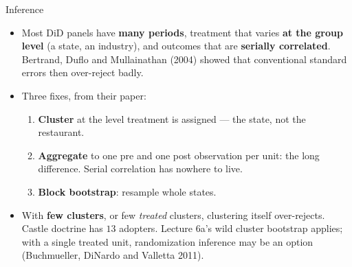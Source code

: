 \documentclass[
  11pt,
  ignorenonframetext,
  aspectratio=169,
]{beamer}
\providecommand{\tightlist}{%
  \setlength{\itemsep}{0pt}\setlength{\parskip}{0pt}}
\begin{document}
\begin{frame}{Inference}
\protect{}\label{inference}
\begin{itemize}
\tightlist
\item
  Most DiD panels have \textbf{many periods}, treatment that varies
  \textbf{at the group level} (a state, an industry), and outcomes that
  are \textbf{serially correlated}. Bertrand, Duflo and Mullainathan
  (2004) showed that conventional standard errors then over-reject
  badly.
\item
  Three fixes, from their paper:

  \begin{enumerate}
  \tightlist
  \item
    \textbf{Cluster} at the level treatment is assigned --- the state,
    not the restaurant.
  \item
    \textbf{Aggregate} to one pre and one post observation per unit: the
    long difference. Serial correlation has nowhere to live.
  \item
    \textbf{Block bootstrap}: resample whole states.
  \end{enumerate}
\end{itemize}

\vspace{0.3em}

\begin{itemize}
\tightlist
\item
  With \textbf{few clusters}, or few \emph{treated} clusters, clustering
  itself over-rejects. Castle doctrine has \(13\) adopters. Lecture 6a's
  wild cluster bootstrap applies; with a single treated unit,
  randomization inference may be an option (Buchmueller, DiNardo and
  Valletta 2011).
\end{itemize}
\end{frame}
\end{document}
